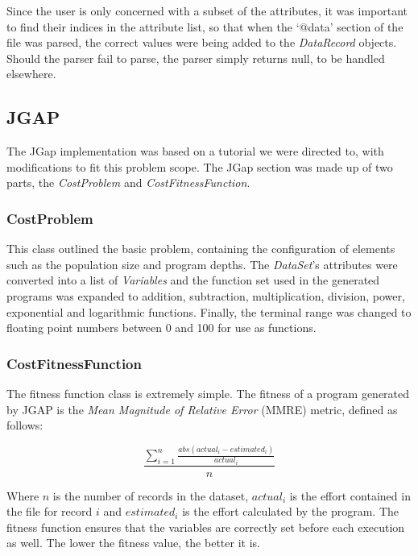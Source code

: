 \documentclass[11pt, a4paper]{article}
\begin{document}
Since the user is only concerned with a subset of the attributes, it was
important to find their indices in the attribute list, so that when the `@data'
section of the file was parsed, the correct values were being added to the
\emph{DataRecord} objects. Should the parser fail to parse, the parser simply
returns null, to be handled elsewhere.

\subsection{JGAP} %
\label{sub:jgap}
The JGap implementation was based on a tutorial \cite{JGapTutorial} we were
directed to, with modifications to fit this problem scope. The JGap section was
made up of two parts, the \emph{CostProblem} and \emph{CostFitnessFunction}.

\subsubsection{CostProblem} %
\label{ssub:costproblem}
This class outlined the basic problem, containing the configuration of elements
such as the population size and program depths. The \emph{DataSet}'s attributes
were converted into a list of \emph{Variables} and the function set used in the
generated programs was expanded to addition, subtraction, multiplication,
division, power, exponential and logarithmic functions. Finally, the terminal
range was changed to floating point numbers between 0 and 100 for use as
functions.

\subsubsection{CostFitnessFunction} %
\label{ssub:costfitnessfunction}
The fitness function class is extremely simple. The fitness of a program
generated by JGAP is the \emph{Mean Magnitude of Relative Error} (MMRE) metric,
defined as follows:

\[\frac{\sum_{i = 1}^{n} \frac{abs(actual_i - estimated_i)}{actual_i}}{n}\]

Where \(n\) is the number of records in the dataset, \(actual_i\) is the effort
contained in the file for record \(i\) and \(estimated_i\) is the effort
calculated by the program. The fitness function ensures that the variables
are correctly set before each execution as well. The lower the fitness value,
the better it is.
\end{document}
